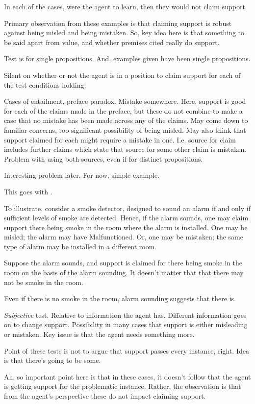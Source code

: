 \begin{note}
  In each of the cases, were the agent to learn, then they would not claim support.
\end{note}

\begin{note}
  Primary observation from these examples is that claiming support is robust against being misled and being mistaken.
  So, key idea here is that something to be said apart from value, and whether premises cited really do support.

  Test is for single propositions.
  And, examples given have been single propositions.

  Silent on whether or not the agent is in a position to claim support for each of the test conditions holding.

  Cases of entailment, preface paradox.
  Mistake somewhere.
  Here, support is good for each of the claims made in the preface, but these do not combine to make a case that no mistake has been made across any of the claims.
  May come down to familiar concerns, too significant possibility of being misled.
  May also think that support claimed for each might require a mistake in one.
  I.e. source for claim includes further claims which state that source for some other claim is mistaken.
  Problem with using both sources, even if for distinct propositions.

  Interesting problem later.
  For now, simple example.


  {
    This goes with \eit{}.

    To illustrate, consider a smoke detector, designed to sound an alarm if and only if sufficient levels of smoke are detected.
    Hence, if the alarm sounds, one may claim support there being smoke in the room where the alarm is installed.
    One may be misled; the alarm may have Malfunctioned.
    Or, one may be mistaken; the same type of alarm may be installed in a different room.

    Suppose the alarm sounds, and support is claimed for there being smoke in the room on the basis of the alarm sounding.
    It doesn't matter that that there may not be smoke in the room.

    Even if there is no smoke in the room, alarm sounding suggests that there is.
  }

  \emph{Subjective} test.
  Relative to information the agent has.
  Different information goes on to change support.
  Possibility in many cases that support is either misleading or mistaken.
  Key issue is that the agent needs something more.

  Point of these tests is not to argue that support passes every instance, right.
  Idea is that there's going to be some.

  Ah, so important point here is that in these cases, it doesn't follow that the agent is getting support for the problematic instance.
  Rather, the observation is that from the agent's perspective these do not impact claiming support.
\end{note}

